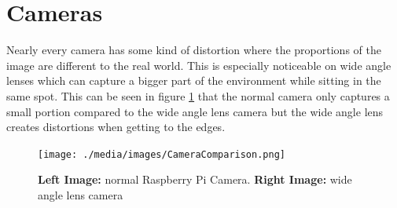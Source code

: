 \section{Cameras\authorA}
Nearly every camera has some kind of distortion where the proportions of the image are different to the real world. This is especially noticeable on wide angle lenses which can capture a bigger part of the environment while sitting in the same spot. This can be seen in figure \ref{cameracomparison} that the normal camera only captures a small portion compared to the wide angle lens camera but the wide angle lens creates distortions when getting to the edges.
\begin{figure}[h]
	\centering
	\texttt{[image: ./media/images/CameraComparison.png]}
  	\caption{\textbf{Left Image:} normal Raspberry Pi Camera. \textbf{Right Image:} wide angle lens camera}
  	\label{cameracomparison}
\end{figure}

